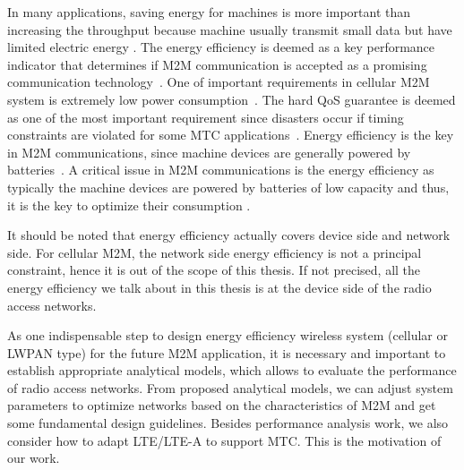 In many applications, saving energy for machines is more important than increasing the throughput because machine usually transmit small data but have limited electric energy \cite{YuanHo12}. The energy efficiency is deemed as a key performance indicator that determines if M2M communication is accepted as a promising communication technology~\cite{lu11GRS}. One of important requirements in cellular M2M system is extremely low power consumption~\cite{IEEE/802.16p/10/0002r7}. The hard QoS guarantee is deemed as one of the most important requirement since disasters occur if timing constraints are violated for some MTC applications~\cite{SYLien11}. Energy efficiency is the key in M2M communications, since machine devices are generally powered by batteries~\cite{Costa14}. A critical issue in M2M communications is the energy efficiency as typically the machine devices are powered by batteries of low capacity and thus, it is the key to optimize their consumption \cite{Costa14}.

It should be noted that energy efficiency actually covers device side and network side. For cellular M2M, the network side energy efficiency is not a principal constraint, hence it is out of the scope of this thesis. If not precised, all the energy efficiency we talk about in this thesis is at the device side of the radio access networks.

As one indispensable step to design energy efficiency wireless system (cellular or LWPAN type) for the future M2M application, it is necessary and important to establish appropriate analytical models, which allows to evaluate the performance of radio access networks. From proposed analytical models, we can adjust system parameters to optimize networks based on the characteristics of M2M and get some fundamental design guidelines. Besides performance analysis work, we also consider how to adapt LTE/LTE-A to support MTC. This is the motivation of our work.








